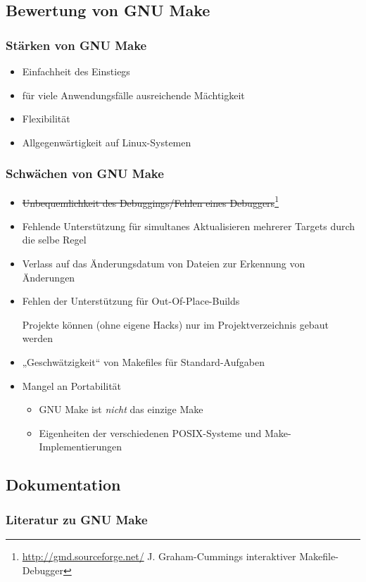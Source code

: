 \subsection{Bewertung von GNU Make}
\begin{frame}
	\frametitle{Stärken von GNU Make}
	\begin{itemize}
		\pause
		\item Einfachheit des Einstiegs
		\pause
		\item für viele Anwendungsfälle ausreichende Mächtigkeit
		\pause
		\item Flexibilität
		\pause
		\item Allgegenwärtigkeit auf Linux-Systemen
	\end{itemize}
\end{frame}

\begin{frame}
	\frametitle{Schwächen von GNU Make}
	\begin{itemize}
		\pause
		\item \sout{Unbequemlichkeit des Debuggings/Fehlen eines Debuggers}\footnote{\tiny\url{http://gmd.sourceforge.net/} J. Graham-Cummings interaktiver Makefile-Debugger}
		\pause
		\item Fehlende Unterstützung für simultanes Aktualisieren mehrerer Targets durch die selbe Regel
		\pause
		\item Verlass auf das Änderungsdatum von Dateien zur Erkennung von Änderungen
		\pause
		\item Fehlen der Unterstützung für Out-Of-Place-Builds

			Projekte können (ohne eigene Hacks) nur im Projektverzeichnis gebaut werden
		\pause
		\item „Geschwätzigkeit“ von Makefiles für Standard-Aufgaben
		\pause
		\item Mangel an Portabilität
			\begin{itemize}
				\pause
				\item GNU Make ist \emph{nicht} das einzige Make
				\pause
				\item Eigenheiten der verschiedenen POSIX-Systeme und Make-Implementierungen
			\end{itemize}
	\end{itemize}
\end{frame}

\subsection{Dokumentation}
\begin{frame}[allowframebreaks]
	\frametitle{Literatur zu GNU Make}
\end{frame}
